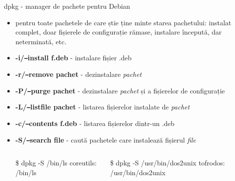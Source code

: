 \documentclass{beamer}
\begin{document}
\begin{frame}{dpkg - manager de pachete pentru Debian}
  \begin{itemize}
  \item pentru toate pachetele de care știe ține minte starea pachetului: 
    instalat complet, doar fișierele de configurație rămase, instalare începută,
    dar neterminată, etc.
  \item \textbf{-i/\texttt{--}install f.deb} - instalare fișier .deb
  \item \textbf{-r/\texttt{--}remove pachet} - dezinstalare \textit{pachet}
  \item \textbf{-P/\texttt{--}purge pachet} - dezinstalare \textit{pachet} și a fișierelor de configurație
  \item \textbf{-L/\texttt{--}listfile pachet} - listarea fișierelor instalate de \textit{pachet}
  \item \textbf{-c/\texttt{--}contents f.deb} - listarea fișierelor dintr-un .deb
  \item \textbf{-S/\texttt{--}search file} - caută pachetele care instalează fișierul \textit{file}
  \begin{columns}[t]
    \begin{column}{4cm}
      \begin{beamerboxesrounded}[lower=block body,shadow=true,width=3cm]{\$ dpkg -S /bin/ls}
        coreutils: /bin/ls
      \end{beamerboxesrounded}
      \end{column}
    \begin{column}{4cm}
      \begin{beamerboxesrounded}[lower=block body,shadow=true,width=5cm]{\$ dpkg -S /usr/bin/dos2unix }
        tofrodos: /usr/bin/dos2unix
      \end{beamerboxesrounded}
    \end{column}
  \end{columns}
  \end{itemize}    
 \end{frame}
\end{document}
